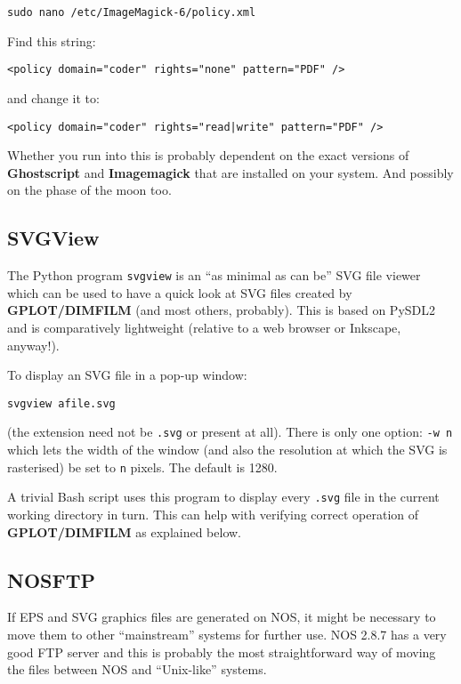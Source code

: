 \documentclass[a4paper,twoside,11pt]{article}
\newcommand{\newpara}{\par\vspace{4mm}\noindent}
\newcommand{\textttc}[1]{\texttt{\textcolor{OurRed}{#1}}}
\begin{document}
\begin{lstlisting}
sudo nano /etc/ImageMagick-6/policy.xml
\end{lstlisting}
Find this string:
\begin{lstlisting}
<policy domain="coder" rights="none" pattern="PDF" />
\end{lstlisting}
and change it to:
\begin{lstlisting}
<policy domain="coder" rights="read|write" pattern="PDF" />
\end{lstlisting}

\newpara
Whether you run into this is probably dependent on the exact versions of \textbf{Ghostscript}
and \textbf{Imagemagick} that are
installed on your system. And possibly on the phase of the moon too.

\subsection{SVGView}
\newpara
The Python program \texttt{svgview} is an ``as minimal as can be'' SVG file viewer which can be used to
have a quick look at SVG files created by \textbf{GPLOT/DIMFILM} (and most others, probably). This
is based on PySDL2 and is comparatively lightweight (relative to a web browser or Inkscape,
anyway!).

\newpara
To display an SVG file in a pop-up window:
\begin{lstlisting}
svgview afile.svg
\end{lstlisting}
(the extension need not be \texttt{.svg} or present at all). There is only one
option: \textttc{-w n} which lets the width of the window (and also the resolution at which
the SVG is rasterised) be set to \textttc{n} pixels. The default is 1280.

\newpara
A trivial Bash script uses this program to display every \texttt{.svg} file in the current working
directory in turn. This can help with verifying correct operation of \textbf{GPLOT/DIMFILM} as
explained below.

\subsection{NOSFTP}
\newpara
If EPS and SVG graphics files are generated on NOS, it might be necessary to move them to other
``mainstream'' systems for further use. NOS 2.8.7 has a very good FTP server and this is probably
the most straightforward way of moving the files between NOS and ``Unix-like'' systems.
\end{document}
